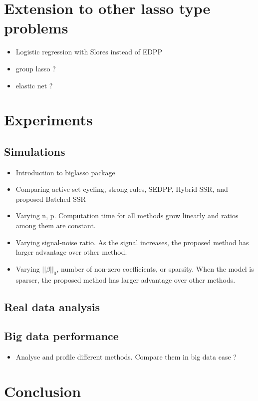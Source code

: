 \documentclass{article}
\begin{document}
\section{Extension to other lasso type problems}
\label{sec:4}

\begin{itemize}
    \item Logistic regression with Slores instead of EDPP
    \item group lasso ?
    \item elastic net ?
\end{itemize}

\section{Experiments}
\label{sec:5}

\subsection{Simulations}
\label{sec:sim}
\begin{itemize}
    \item Introduction to biglasso package
\end{itemize}
\begin{itemize}
    \item Comparing active set cycling, strong rules, SEDPP, Hybrid SSR, and proposed Batched SSR
    \item Varying n, p. Computation time for all methods grow linearly and ratios among them are constant.
    \item Varying signal-noise ratio. As the signal increases, the proposed method has larger advantage over other method.
    \item Varying $||\beta||_0$, number of non-zero coefficients, or sparsity. When the model is sparser, the proposed method has larger advantage over other methods.
\end{itemize}

\subsection{Real data analysis}
\label{sec:real-data}

\subsection{Big data performance}

\begin{itemize}
    \item Analyse and profile different methods. Compare them in big data case ?
\end{itemize}

\section{Conclusion}
\label{sec:6}




\end{document}
